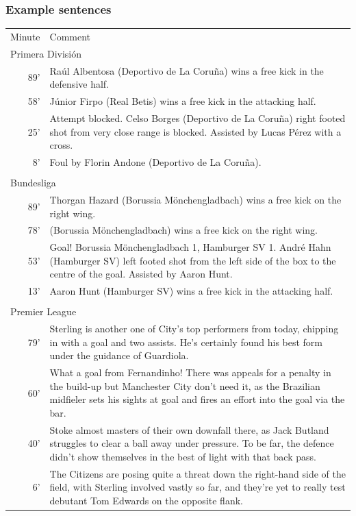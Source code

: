 \documentclass{beamer}
\begin{document}
\begin{frame}
\frametitle{Example sentences}
\tiny
\begin{tabular}{r p{8cm}}
Minute & Comment\\
\multicolumn{2}{l}{Primera División}
\\\hline
89' &  Raúl Albentosa (Deportivo de La Coruña) wins a free kick in the defensive half.\\
58' &  Júnior Firpo (Real Betis) wins a free kick in the attacking half.\\
25' &  Attempt blocked. Celso Borges (Deportivo de La Coruña) right footed shot from very close range is blocked. Assisted by Lucas Pérez with a cross.\\
8' & Foul by Florin Andone (Deportivo de La Coruña).\\\\
\multicolumn{2}{l}{Bundesliga}\\\hline
89' &  Thorgan Hazard (Borussia Mönchengladbach) wins a free kick on the right wing.\\
78' &  (Borussia Mönchengladbach) wins a free kick on the right wing.\\
53' & Goal! Borussia Mönchengladbach 1, Hamburger SV 1. André Hahn (Hamburger SV) left footed shot from the left side of the box to the centre of the goal. Assisted by Aaron Hunt.\\
13' & Aaron Hunt (Hamburger SV) wins a free kick in the attacking half.\\\\
\multicolumn{2}{l}{Premier League}\\\hline
79' & Sterling is another one of City's top performers from today, chipping in with a goal and two assists. He's certainly found his best form under the guidance of Guardiola.\\
60' & What a goal from Fernandinho! There was appeals for a penalty in the build-up but Manchester City don't need it, as the Brazilian midfieler sets his sights at goal and fires an effort into the goal via the bar. \\
40' & Stoke almost masters of their own downfall there, as Jack Butland struggles to clear a ball away under pressure. To be far, the defence didn't show themselves in the best of light with that back pass.\\
6' & The Citizens are posing quite a threat down the right-hand side of the field, with Sterling involved vastly so far, and they're yet to really test debutant Tom Edwards on the opposite flank.\\\hline
\end{tabular}
\end{frame}
\end{document}
